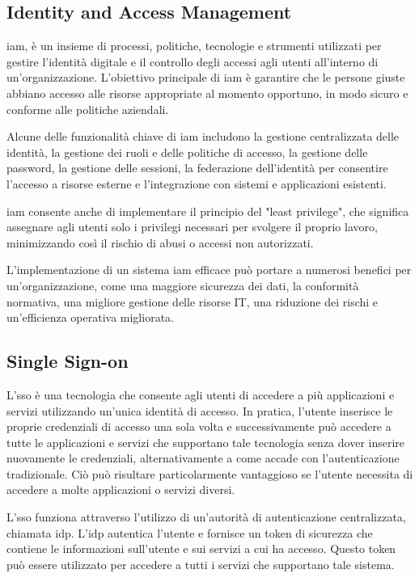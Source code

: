 \subsection{Identity and Access Management}

\acrshort{iam}\cite{site:iam}, è un insieme di processi, politiche, tecnologie e strumenti utilizzati per gestire l'identità digitale e il controllo degli accessi agli utenti all'interno di un'organizzazione. L'obiettivo principale di \acrshort{iam} è garantire che le persone giuste abbiano accesso alle risorse appropriate al momento opportuno, in modo sicuro e conforme alle politiche aziendali.

Alcune delle funzionalità chiave di \acrshort{iam} includono la gestione centralizzata delle identità, la gestione dei ruoli e delle politiche di accesso, la gestione delle password, la gestione delle sessioni, la federazione dell'identità per consentire l'accesso a risorse esterne e l'integrazione con sistemi e applicazioni esistenti.

\acrshort{iam} consente anche di implementare il principio del "least privilege", che significa assegnare agli utenti solo i privilegi necessari per svolgere il proprio lavoro, minimizzando così il rischio di abusi o accessi non autorizzati.

L'implementazione di un sistema \acrshort{iam} efficace può portare a numerosi benefici per un'organizzazione, come una maggiore sicurezza dei dati, la conformità normativa, una migliore gestione delle risorse IT, una riduzione dei rischi e un'efficienza operativa migliorata.


\subsection{Single Sign-on}

L'\acrshort{sso}\cite{site:sso} è una tecnologia che consente agli utenti di accedere a più applicazioni e servizi utilizzando un'unica identità di accesso. In pratica, l'utente inserisce le proprie credenziali di accesso una sola volta e successivamente può accedere a tutte le applicazioni e servizi che supportano tale tecnologia senza dover inserire nuovamente le credenziali, alternativamente a come accade con l'autenticazione tradizionale. Ciò può risultare particolarmente vantaggioso se l'utente necessita di accedere a molte applicazioni o servizi diversi.

L'\acrshort{sso} funziona attraverso l'utilizzo di un'autorità di autenticazione centralizzata, chiamata \acrfull{idp}. L'\acrshort{idp} autentica l'utente e fornisce un token di sicurezza che contiene le informazioni sull'utente e sui servizi a cui ha accesso. Questo token può essere utilizzato per accedere a tutti i servizi che supportano tale sistema.

